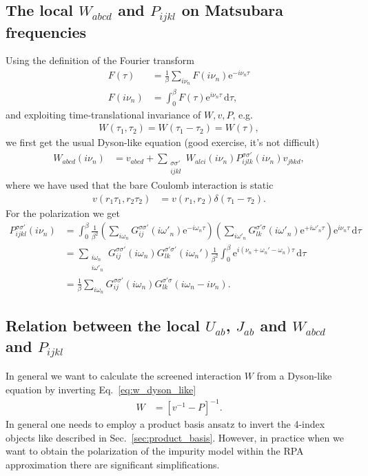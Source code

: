 \documentclass[12pt,a4paper]{scrartcl}
\numberwithin{equation}{section}
\begin{document}
\subsection{The local $W_{abcd}$ and $P_{ijkl}$ on Matsubara frequencies}
\label{sec:local_w_p_matsubara}
Using the definition of the Fourier transform
\begin{align}
 F(\tau)   &= \frac{1}{\beta} \sum_{i\nu_n} F(i\nu_n)\mathrm{e}^{-i\nu_n\tau} \\
 F(i\nu_n) &= \int_{0}^{\beta} F(\tau)\mathrm{e}^{i\nu_n\tau} \, \mathrm{d}\tau,
\end{align}
and exploiting time-translational invariance of $W,v,P$, e.g.
\begin{align}
 W(\tau_1,\tau_2) = W(\tau_1-\tau_2) = W(\tau),
\end{align}
we first get the usual Dyson-like equation (good exercise, it's not difficult)
\begin{align}
W_{abcd}(i\nu_n)
%
&= v_{abcd}  + \sum_{\substack{\sigma\sigma' \\ ijkl }}
                     W_{alci}(i\nu_n) P^{\sigma\sigma'}_{ijlk}(i\nu_n)
                     v_{jbkd}, \label{eq:w_dyson_like}
\end{align}
where we have used that the bare Coulomb interaction is static
\begin{align}
 v(r_1\tau_1,r_2\tau_2) &= v(r_1,r_2) \delta(\tau_1-\tau_2).
\end{align}
For the polarization we get
\begin{align}
 P^{\sigma\sigma'}_{ijkl}(i\nu_n)
 &= \int_{0}^{\beta} \frac{1}{\beta^2}
      \left( \sum_{i\omega_n} G^{\sigma\sigma'}_{ij}(i\omega'_n) \mathrm{e}^{-i\omega_n\tau} \right)
      \left( \sum_{i\omega'_n} G^{\sigma'\sigma}_{lk}(i\omega'_n) \mathrm{e}^{+i\omega'_n\tau} \right)
      \mathrm{e}^{i\nu_n\tau} \, \mathrm{d}\tau  \\
%
 &= \sum_{\substack{i\omega_n\\i\omega'_n}} G^{\sigma\sigma'}_{ij}(i\omega_n)
                                            G^{\sigma'\sigma'}_{lk}(i\omega_n')
      \frac{1}{\beta^2} \int_{0}^{\beta} \mathrm{e}^{i(\nu_n+\omega_n'-\omega_n) \tau}   \, \mathrm{d}\tau  \\
%
 &=\frac{1}{\beta} \sum_{i\omega_n} G^{\sigma\sigma'}_{ij}(i\omega_n)
                     G^{\sigma'\sigma}_{lk}(i\omega_n-i\nu_n).
\end{align}




\subsection{Relation between the local $U_{ab}$, $J_{ab}$ and $W_{abcd}$ and $P_{ijkl}$ }
In general we want to calculate the screened interaction $W$ from 
a Dyson-like equation by inverting Eq.~\ref{eq:w_dyson_like}
\begin{align}
 W &= [v^{-1} - P ]^{-1}.
\end{align}
In general one needs to employ a product basis ansatz
to invert the 4-index objects like described in Sec.~\ref{sec:product_basis}.
However, in practice when we want to obtain the polarization of the impurity
model within the RPA approximation there are significant simplifications.
\end{document}
